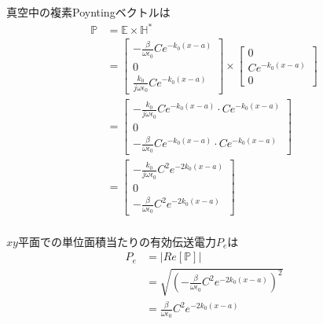 \documentclass[a4paper,10pt]{bxjsarticle}
\begin{document}
真空中の複素Poyntingベクトルは
\begin{align*}
    \mathbb{P} &= \mathbb{E} \times \mathbb{H}^* \\ 
    &= \begin{bmatrix}
        -\frac{\beta}{\omega \epsilon_0} C e^{-k_0(x-a)} \\
        0 \\
        \frac{k_0}{j\omega \epsilon_0} C e^{-k_0(x-a)}
    \end{bmatrix} \times
    \begin{bmatrix}
        0 \\
        C e^{-k_0(x-a)} \\
        0
    \end{bmatrix} \\
    &= \begin{bmatrix}
        -\frac{k_0}{j\omega \epsilon_0} C e^{-k_0(x-a)} \cdot C e^{-k_0(x-a)} \\
        0 \\
        -\frac{\beta}{\omega \epsilon_0} C e^{-k_0(x-a)} \cdot C e^{-k_0(x-a)}
    \end{bmatrix} \\
    &= \begin{bmatrix}
        -\frac{k_0}{j\omega \epsilon_0} C^2 e^{-2k_0(x-a)} \\
        0 \\
        -\frac{\beta}{\omega \epsilon_0} C^2 e^{-2k_0(x-a)}
    \end{bmatrix} \\
\end{align*}

$xy$平面での単位面積当たりの有効伝送電力$P_e$は
\begin{align*}
    P_e &= | Re \left[ \mathbb{P} \right] | \\
    &= \sqrt{ \left( -\frac{\beta}{\omega \epsilon_0} C^2 e^{-2k_0(x-a)} \right)^2} \\
    &= \frac{\beta}{\omega \epsilon_0} C^2 e^{-2k_0(x-a)} \\
\end{align*}
\end{document}
